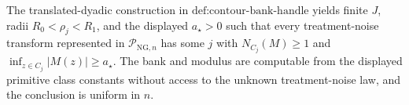 The translated-dyadic construction in \(\text{def:contour-bank-handle}\) yields finite \(J\), radii \(R_0<\rho_j<R_1\), and the displayed \(a_{\star}>0\) such that every treatment-noise transform represented in \(\mathcal P_{\mathrm{NG},n}\) has some \(j\) with \(N_{C_j}(M)\ge1\) and \(\inf_{z\in C_j}|M(z)|\ge a_{\star}\).  The bank and modulus are computable from the displayed primitive class constants without access to the unknown treatment-noise law, and the conclusion is uniform in \(n\).
